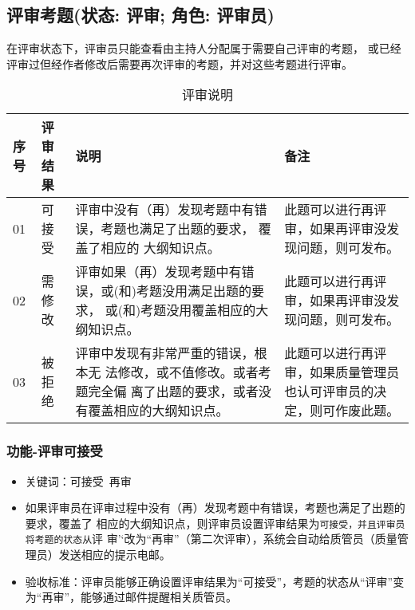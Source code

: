 \documentclass[hyperref, a4paper]{ctexart}
\providecommand{\tightlist}{%
  \setlength{\itemsep}{0pt}\setlength{\parskip}{0pt}}
\begin{document}
\hypertarget{ux8bc4ux5ba1ux8003ux9898ux72b6ux6001-ux8bc4ux5ba1-ux89d2ux8272-ux8bc4ux5ba1ux5458}{%
\subsection{评审考题(状态: 评审; 角色:
评审员)}\label{ux8bc4ux5ba1ux8003ux9898ux72b6ux6001-ux8bc4ux5ba1-ux89d2ux8272-ux8bc4ux5ba1ux5458}}

在评审状态下，评审员只能查看由主持人分配属于需要自己评审的考题，
或已经评审过但经作者修改后需要再次评审的考题，并对这些考题进行评审。

\begin{table}[!htbp]
  \caption{评审说明}
  \label{Tab:bookRWCal}
  \centering
  \begin{tabular}{|l|p{1.5cm}|p{5.3cm}|p{3.3cm}|}
  \hline
  \textbf{序号} &\textbf{评审结果} &\textbf{说明}&\textbf{备注}\\
  \hline
  01 & 可接受  & 评审中没有（再）发现考题中有错误，考题也满足了出题的要求，
  覆盖了相应的 大纲知识点。& 此题可以进行再评审，如果再评审没发现问题，则可发布。\\
  \hline
  02 & 需修改  & 评审如果（再）发现考题中有错误，或(和)考题没用满足出题的要求，
  或(和)考题没用覆盖相应的大纲知识点。& 此题可以进行再评审，如果再评审没发现问题，则可发布。\\
  \hline
  03  & 被拒绝 & 评审中发现有非常严重的错误，根本无 法修改，或不值修改。或者考题完全偏
  离了出题的要求，或者没有覆盖相应的大纲知识点。& 此题可以进行再评审，如果质量管理员也认可评审员的决定，则可作废此题。\\
  \hline
  \end{tabular}
\end{table}

\hypertarget{ux529fux80fd-ux8bc4ux5ba1ux53efux63a5ux53d7}{%
\subsubsection{功能-评审可接受}\label{ux529fux80fd-ux8bc4ux5ba1ux53efux63a5ux53d7}}

\begin{itemize}
\tightlist
\item
  关键词：可接受~再审
\item
  如果评审员在评审过程中没有（再）发现考题中有错误，考题也满足了出题的要求，覆盖了
  相应的大纲知识点，则评审员设置评审结果为\texttt{可接受\textquotesingle{}\textquotesingle{}，并且评审员将考题的状态从}评
  审'`改为``再审''（第二次评审），系统会自动给质管员（质量管理员）发送相应的提示电邮。
\item
  验收标准：评审员能够正确设置评审结果为``可接受''，考题的状态从``评审''变为``再审''，能够通过邮件提醒相关质管员。
\end{itemize}
\end{document}
